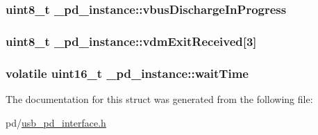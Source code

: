 \hypertarget{struct__pd__instance_a4905e96236b6de63bba2c1d34c5a0a8b}{
\subsubsection[{vbus\-Discharge\-In\-Progress}]{\setlength{\rightskip}{0pt plus 5cm}uint8\-\_\-t \-\_\-pd\-\_\-instance\-::vbus\-Discharge\-In\-Progress}}\label{struct__pd__instance_a4905e96236b6de63bba2c1d34c5a0a8b}
\hypertarget{struct__pd__instance_afcd5caf46554e0640a45ac547d7bacf0}{
\subsubsection[{vdm\-Exit\-Received}]{\setlength{\rightskip}{0pt plus 5cm}uint8\-\_\-t \-\_\-pd\-\_\-instance\-::vdm\-Exit\-Received\mbox{[}3\mbox{]}}}\label{struct__pd__instance_afcd5caf46554e0640a45ac547d7bacf0}
\hypertarget{struct__pd__instance_a2505651a0001ea647306dbd800927778}{
\subsubsection[{wait\-Time}]{\setlength{\rightskip}{0pt plus 5cm}volatile uint16\-\_\-t \-\_\-pd\-\_\-instance\-::wait\-Time}}\label{struct__pd__instance_a2505651a0001ea647306dbd800927778}


The documentation for this struct was generated from the following file\-:\begin{DoxyCompactItemize}
\item 
pd/\hyperlink{usb__pd__interface_8h}{usb\-\_\-pd\-\_\-interface.\-h}\end{DoxyCompactItemize}
